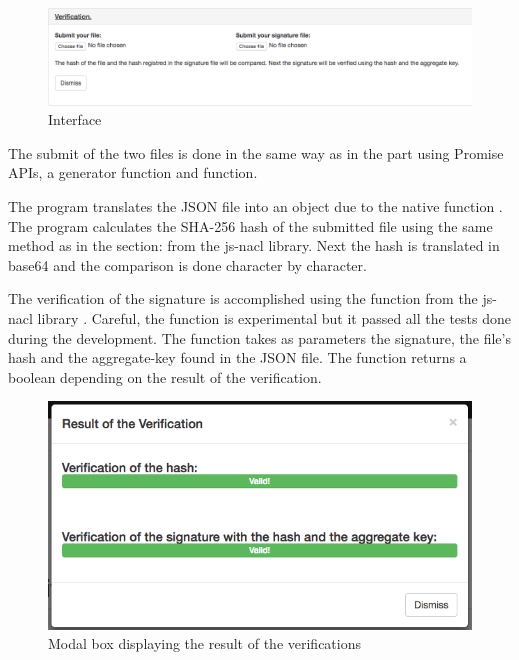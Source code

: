 \documentclass[11pt, a4paper, twoside, openright, openany]{article} %
\begin{document}
\begin{figure}[ht!]
\centering
\includegraphics[width=125mm]{verification_verification.jpg}
\caption{Interface}
\end{figure}
\leavevmode \newline

The submit of the two files is done in the same way as in the  part
using Promise APIs, a generator function and  function.
\bigbreak

The program translates the JSON file into an object due to the native function .
\newline
The program calculates the SHA-256 hash of the submitted file using the same method as in the
section:  from the js-nacl library.
Next the hash is translated in base64 and the comparison is done character by character.
\bigbreak

The verification of the signature is accomplished using the function
from the js-nacl library .
\newline
Careful, the function is experimental but it passed all the tests done during the development.
\newline
The function takes as parameters the signature, the file's hash and the aggregate-key found in
the JSON file. The function returns a boolean depending on the result of the verification.
\bigbreak

\begin{figure}[ht!]
\centering
\includegraphics[width=125mm]{modal.jpg}
\caption{Modal box displaying the result of the verifications}
\end{figure}
\leavevmode \newline
\end{document}
